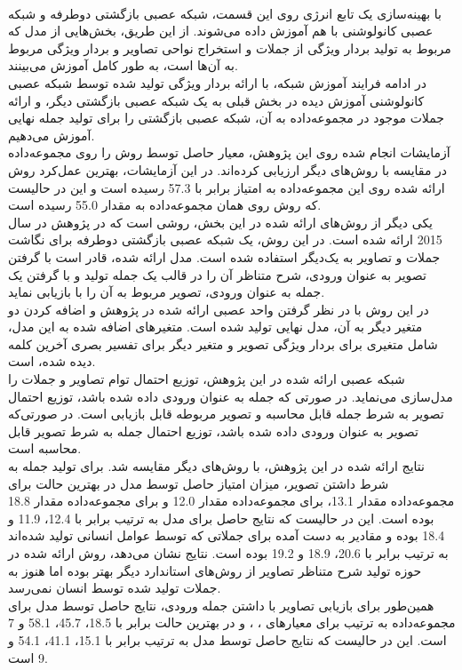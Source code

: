 \\
با بهینه‌سازی یک تابع انرژی روی این قسمت، شبکه عصبی بازگشتی دوطرفه و شبکه عصبی کانولوشنی با هم آموزش داده می‌شوند. از این طریق، بخش‌هایی از مدل که مربوط به تولید بردار ویژگی از جملات و استخراج نواحی تصاویر و بردار ویژگی مربوط به آن‌ها است، به طور کامل آموزش می‌بینند.
\\
در ادامه فرایند آموزش شبکه، با ارائه بردار ویژگی تولید شده توسط شبکه عصبی کانولوشنی آموزش دیده در بخش قبلی به یک شبکه عصبی بازگشتی دیگر، و ارائه جملات موجود در مجموعه‌داده به آن، شبکه عصبی بازگشتی را برای تولید جمله نهایی آموزش می‌دهیم.
\\
آزمایشات انجام شده روی این پژوهش، معیار  حاصل توسط روش را روی مجموعه‌داده  در مقایسه با روش‌های دیگر ارزیابی کرده‌اند. در این آزمایشات، بهترین عمل‌کرد روش ارائه شده روی این مجموعه‌داده به امتیاز  برابر با 57.3 رسیده است و این در حالیست که روش \cite{mao2014explain} روی همان مجموعه‌داده به مقدار 55.0 رسیده است.
\\
یکی دیگر از روش‌های ارائه شده در این بخش، روشی است که در پژوهش \cite{chen2015mind} در سال 2015 ارائه شده است. در این روش، یک شبکه عصبی بازگشتی دوطرفه برای نگاشت جملات و تصاویر به یک‌دیگر استفاده شده است. مدل ارائه شده، قادر است با گرفتن تصویر به عنوان ورودی، شرح متناظر آن را در قالب یک جمله تولید و با گرفتن یک جمله به عنوان ورودی، تصویر مربوط به آن را با بازیابی نماید.
\\
در این روش با در نظر گرفتن واحد عصبی ارائه شده در پژوهش \cite{mikolov2010recurrent} و اضافه کردن دو متغیر دیگر به آن، مدل نهایی تولید شده است. متغیرهای اضافه شده به این مدل، شامل متغیری برای  بردار ویژگی تصویر و متغیر دیگر برای تفسیر بصری آخرین کلمه دیده شده، است.
\\
شبکه عصبی ارائه شده در این پژوهش، توزیع احتمال توام تصاویر و جملات را مدل‌سازی می‌نماید. در صورتی که جمله به عنوان ورودی داده شده باشد، توزیع احتمال تصویر به شرط جمله قابل محاسبه و تصویر مربوطه قابل بازیابی است. در صورتی‌که تصویر به عنوان ورودی داده شده باشد، توزیع احتمال جمله به شرط تصویر قابل محاسبه است.
\\
نتایج ارائه شده در این پژوهش، با روش‌های دیگر مقایسه شد. برای تولید جمله به شرط داشتن تصویر، میزان امتیاز  حاصل توسط مدل در بهترین حالت برای مجموعه‌داده  مقدار 13.1، برای مجموعه‌داده  مقدار 12.0 و برای مجموعه‌داده  مقدار 18.8 بوده است. این در حالیست که نتایج حاصل برای مدل  به ترتیب برابر با 12.4، 11.9 و 18.4 بوده و مقادیر به دست آمده برای جملاتی که توسط عوامل انسانی تولید شده‌اند به ترتیب برابر با 20.6، 18.9 و 19.2 بوده است. نتایج نشان می‌دهد، روش ارائه شده در حوزه تولید شرح متناظر تصاویر از روش‌های استاندارد دیگر بهتر بوده اما هنوز به جملات تولید شده توسط انسان نمی‌رسد.
\\
همین‌طور برای بازیابی تصاویر با داشتن جمله ورودی، نتایج حاصل توسط مدل برای مجموعه‌داده‌  به ترتیب برای معیارهای ، ،   و  در بهترین حالت برابر با 18.5، 45.7، 58.1 و 7 است. این در حالیست که نتایج حاصل توسط مدل  به ترتیب برابر با 15.1، 41.1، 54.1 و 9 است.


